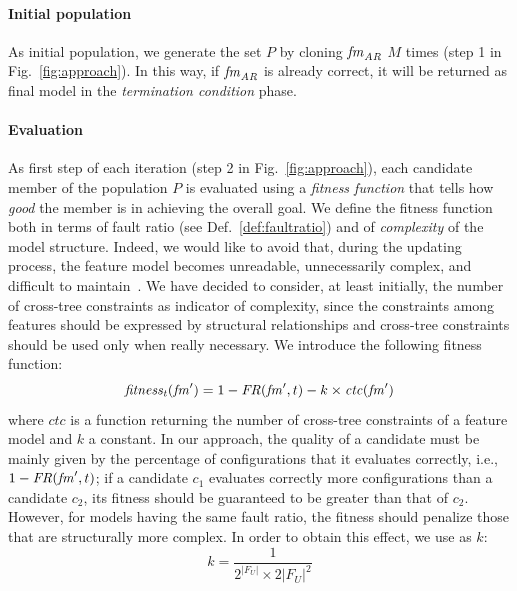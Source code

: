 \begin{tikzborder}{\cite{Gargantini16:validation}}
\begin{tikzborder}{\cite{gargantini_combinatorial_2017}}
\begin{tikzborder}{\cite{gargantini_combinatorial_2017}}
\begin{tikzborder}{\cite{garn2019}}
\begin{tikzborder}{\cite{arcaini2019achieving}}
	\paragraph{\bf Initial population}%
	
	\bb
	As initial population, we generate the set $P$ by cloning $\mathit{fm}_{\mathit{AR}}$ $M$ times (step 1 in Fig.~\ref{fig:approach}). In this way, if $\mathit{fm}_{\mathit{AR}}$ is already correct, it will be returned as final model in the \emph{termination condition} phase.
	\be
	
	\paragraph{\bf Evaluation}%
	\bb As first step of each iteration (step 2 in Fig.~\ref{fig:approach}), each candidate member \fmp of the population $P$ is evaluated using a \emph{fitness function} that tells how \emph{good} the member is in achieving the overall goal. We define the fitness function both in terms of fault ratio (see Def.~\ref{def:faultratio}) and of {\it complexity} of the model structure. Indeed, we would like to avoid that, during the updating process, the feature model becomes unreadable, unnecessarily complex, and difficult to maintain~\cite{Berger2013,visualSupport,ComprehendingFeatureModels,FeatureIDEbook}. We have decided to consider, at least initially, the number of cross-tree constraints as indicator of complexity, since the constraints among features should be expressed by structural relationships and cross-tree constraints should be used only when really necessary. We introduce the following fitness function:\be
	\begin{equation}\label{eq:fitness}
	\mathit{fitness_t}(\mathit{fm}^\prime) = 1 - \mathit{FR}(\mathit{fm}^\prime, t) - k \times \mathit{ctc}(\mathit{fm}^\prime)
	\end{equation}
	\bb where $\mathit{ctc}$ is a function returning the number of cross-tree constraints of a feature model and $k$ a constant. In our approach, the quality of a candidate must be mainly given by the percentage of configurations that it evaluates correctly, i.e., $1 - \mathit{FR}(\mathit{fm}^\prime, t)$; if a candidate $c_1$ evaluates correctly more configurations than a candidate $c_2$, its fitness should be guaranteed to be greater than that of $c_2$. However, for models having the same fault ratio, the fitness should penalize those that are structurally more complex. In order to obtain this effect, we use as $k$:\be
	\begin{equation}\label{eq:kFitness}
	k = \frac{1}{{2^{|F_U|} \times 2|F_U|^2}}
	\end{equation}
	

\end{tikzborder}
\end{tikzborder}
\end{tikzborder}
\end{tikzborder}
\end{tikzborder}
